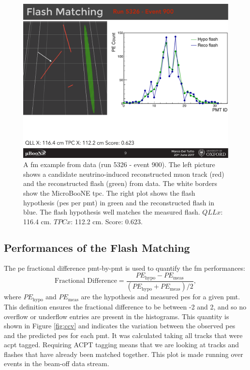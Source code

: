 \begin{figure}[]
\centering
\includegraphics[width=.70\textwidth]{images/FlashMatching/flash_match_data_1}
\caption[Flash Matching in Data]{A \acrlong{fm} example from data (run 5326 - event 900). The left picture shows a candidate neutrino-induced reconstructed muon track (red) and the reconstructed flash (green) from data. The white borders show the MicroBooNE \acrshort{tpc}. The right plot shows the flash hypothesis (\acrshort{pe}s per \acrshort{pmt}) in green and the reconstructed flash in blue. The flash hypothesis well matches the measured flash. $QLLx$: 116.4 cm. $TPCx$: 112.2 cm. Score: 0.623.}
\label{fig:flash_match_data}
\end{figure}







\subsection{Performances of the Flash Matching}

The \acrshort{pe} fractional difference \acrshort{pmt}-by-\acrshort{pmt} is used to quantify the \acrshort{fm} performances:
\begin{equation}
\label{eq:ccv}
\text{Fractional Difference} = \frac{PE_\text{hypo} - PE_\text{meas}}{(PE_\text{hypo} + PE_\text{meas})/2},
\end{equation}
where $PE_\text{hypo}$ and $PE_\text{meas}$ are the hypothesis and measured \acrshort{pe}s for a given \acrshort{pmt}. This definition ensures the fractional difference to be between -2 and 2, and so no overflow or underflow entries are present in the histograms.  This quantity is shown in Figure \ref{fig:ccv} and indicates the variation between the observed \acrshort{pe}s and the predicted \acrshort{pe}s for each \acrshort{pmt}.  It was calculated taking all tracks that were \acrshort{acpt} tagged. Requiring ACPT tagging means that we are looking at tracks and flashes that have already been matched together. This plot is made running over events in the beam-off data stream.

